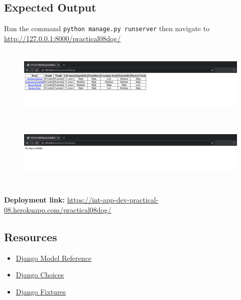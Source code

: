 \documentclass{article}
\begin{document}
\subsection*{Expected Output} 
Run the command \texttt{python manage.py runserver} then navigate to \href{http://127.0.0.1:8000/practical08dog/}{http://127.0.0.1:8000/practical08dog/}

\begin{figure}[H]
  \includegraphics[width=175mm, height=35mm]{./img/08-expected-dog-4.png}
  \includegraphics[width=175mm, height=35mm]{./img/08-expected-dog-5.png} 
\end{figure}

\textbf{Deployment link:} \href{https://int-app-dev-practical-08.herokuapp.com/practical08dog/}{https://int-app-dev-practical-08.herokuapp.com/practical08dog/}

\subsection*{Resources}
\begin{itemize}
  \item \href{https://docs.djangoproject.com/en/3.0/ref/models/fields/#module-django.db.models.fields}{Django Model Reference}
  \item \href{https://docs.djangoproject.com/en/3.0/ref/models/fields/#choices}{Django Choices}
  \item \href{https://docs.djangoproject.com/en/3.0/howto/initial-data/}{Django Fixtures}
\end{itemize}
 
\end{document}
